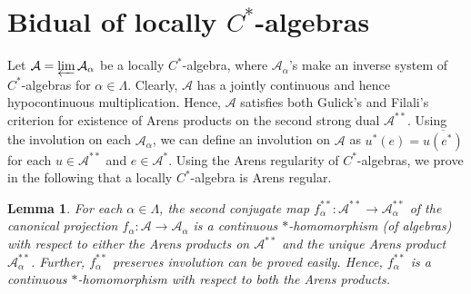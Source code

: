 \documentclass[10pt]{article}
\newtheorem{lemma}[theorem]{Lemma}
\theoremstyle{definition}
\begin{document}
	\section{Bidual of locally $C^*$-algebras}\label{mainsection}
	Let $\mathcal A=\varprojlim \mathcal A_\alpha$ be a locally $C^*$-algebra, where $\mathcal A_\alpha$'s make an inverse system of $C^*$-algebras for $\alpha\in \Lambda$. Clearly, $\mathcal A$ has a jointly continuous and hence hypocontinuous multiplication. Hence, $\mathcal A$ satisfies both Gulick's \cite{Gulick} and Filali's \cite{Filali} criterion for existence of Arens products on the second strong dual $\mathcal A^{**}$. Using the involution on each $\mathcal A_\alpha$, we can define an involution on $\mathcal A$ as $u^*(e)=\overline{u(e^*)}$ for each $u\in \mathcal A^{**}$ and $e\in \mathcal A^*$. Using the Arens regularity of  $C^*$-algebras, we prove in the following that a locally $C^*$-algebra is Arens regular.
	\begin{lemma}
For each $\alpha\in \Lambda$, the second conjugate map $f_\alpha^{**}:\mathcal A^{**}\to \mathcal A_\alpha^{**}$ of the canonical projection $f_\alpha:\mathcal A\to \mathcal A_\alpha$ is a continuous $*$-homomorphism (of algebras) with respect to either the Arens products on $\mathcal A^{**}$ and the unique Arens product $\mathcal A^{**}_\alpha$. Further, $f_\alpha^{**}$ preserves involution can be proved easily. Hence, $f_\alpha^{**}$ is a continuous $*$-homomorphism with respect to both the Arens products.
	\end{lemma}
\end{document}
